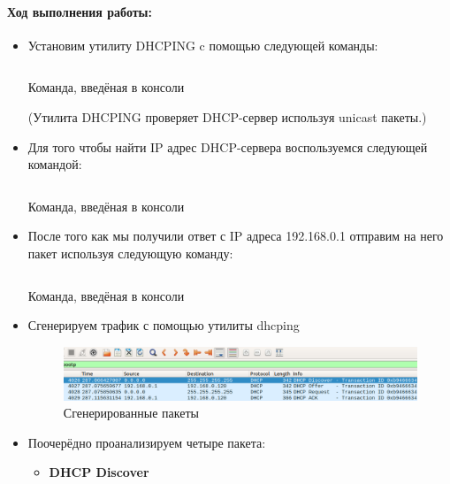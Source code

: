 \paragraph{Ход выполнения работы:}
\begin{itemize}
    \item Установим утилиту DHCPING c помощью следующей команды:
    \begin{code}
	\inputminted[breaklines=true, xleftmargin=1em, linenos, frame=single, framesep=10pt, fontsize=\footnotesize, firstline=1, lastline=33]{haskell}{fig/dhcping.bash}
	\caption{Команда, введёная в консоли}
    \end{code}
    (Утилита DHCPING проверяет DHCP-сервер используя unicast пакеты.)
    \item Для того чтобы найти IP адрес DHCP-сервера воспользуемся следующей командой: 
    \begin{code}
	\inputminted[breaklines=true, xleftmargin=1em, linenos, frame=single, framesep=10pt, fontsize=\footnotesize, firstline=1, lastline=33]{haskell}{fig/dhcp_serv.bash}
	\caption{Команда, введёная в консоли}
    \end{code}
    \item После того как мы получили ответ с IP адреса 192.168.0.1 отправим на него пакет используя следующую команду:
    \begin{code}
	\inputminted[breaklines=true, xleftmargin=1em, linenos, frame=single, framesep=10pt, fontsize=\footnotesize, firstline=1, lastline=33]{haskell}{fig/dhcp_serv1.bash}
	\caption{Команда, введёная в консоли}
    \end{code}
    
    
    
    \item Сгенерируем трафик с помощью утилиты dhcping
    \begin{figure}[H]
    \begin{center}
	    \includegraphics[scale=0.7]{fig/dhcping.png}
	    \caption{Сгенерированные пакеты}
	    \label{pic:10dadwad} %
    \end{center}
    \end{figure}
    
    \newpage
    
    \item Поочерёдно проанализируем четыре пакета:
    \begin{itemize}
        \item \textbf{DHCP Discover}\\
        

\end{itemize}
\end{itemize}
